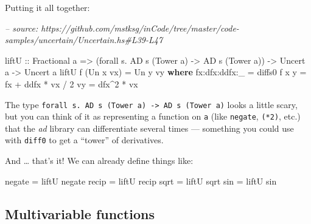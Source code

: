 \documentclass[]{article}
\newenvironment{Shaded}{}{}
\newcommand{\CommentTok}[1]{\textcolor[rgb]{0.38,0.63,0.69}{\textit{#1}}}
\newcommand{\DataTypeTok}[1]{\textcolor[rgb]{0.56,0.13,0.00}{#1}}
\newcommand{\DecValTok}[1]{\textcolor[rgb]{0.25,0.63,0.44}{#1}}
\newcommand{\FunctionTok}[1]{\textcolor[rgb]{0.02,0.16,0.49}{#1}}
\newcommand{\KeywordTok}[1]{\textcolor[rgb]{0.00,0.44,0.13}{\textbf{#1}}}
\newcommand{\NormalTok}[1]{#1}
\newcommand{\OtherTok}[1]{\textcolor[rgb]{0.00,0.44,0.13}{#1}}
\begin{document}
Putting it all together:

\begin{Shaded}
\begin{Highlighting}[]
\CommentTok{-- source: https://github.com/mstksg/inCode/tree/master/code-samples/uncertain/Uncertain.hs#L39-L47}

\OtherTok{liftU ::} \DataTypeTok{Fractional}\NormalTok{ a}
      \OtherTok{=>}\NormalTok{ (forall s}\FunctionTok{.} \DataTypeTok{AD}\NormalTok{ s (}\DataTypeTok{Tower}\NormalTok{ a) }\OtherTok{->} \DataTypeTok{AD}\NormalTok{ s (}\DataTypeTok{Tower}\NormalTok{ a))}
      \OtherTok{->} \DataTypeTok{Uncert}\NormalTok{ a}
      \OtherTok{->} \DataTypeTok{Uncert}\NormalTok{ a}
\NormalTok{liftU f (}\DataTypeTok{Un}\NormalTok{ x vx) }\FunctionTok{=} \DataTypeTok{Un}\NormalTok{ y vy}
  \KeywordTok{where}
\NormalTok{    fx}\FunctionTok{:}\NormalTok{dfx}\FunctionTok{:}\NormalTok{ddfx}\FunctionTok{:}\NormalTok{_ }\FunctionTok{=}\NormalTok{ diffs0 f x}
\NormalTok{    y             }\FunctionTok{=}\NormalTok{ fx }\FunctionTok{+}\NormalTok{ ddfx }\FunctionTok{*}\NormalTok{ vx }\FunctionTok{/} \DecValTok{2}
\NormalTok{    vy            }\FunctionTok{=}\NormalTok{ dfx}\FunctionTok{^}\DecValTok{2} \FunctionTok{*}\NormalTok{ vx}
\end{Highlighting}
\end{Shaded}

The type
\texttt{forall\ s.\ AD\ s\ (Tower\ a)\ -\textgreater{}\ AD\ s\ (Tower\ a)} looks
a little scary, but you can think of it as representing a function on \texttt{a}
(like \texttt{negate}, \texttt{(*2)}, etc.) that the \emph{ad} library can
differentiate several times --- something you could use with \texttt{diff0} to
get a ``tower'' of derivatives.

And \ldots{} that's it! We can already define things like:

\begin{Shaded}
\begin{Highlighting}[]
\NormalTok{negate }\FunctionTok{=}\NormalTok{ liftU negate}
\NormalTok{recip  }\FunctionTok{=}\NormalTok{ liftU recip}
\NormalTok{sqrt   }\FunctionTok{=}\NormalTok{ liftU sqrt}
\NormalTok{sin    }\FunctionTok{=}\NormalTok{ liftU sin}
\end{Highlighting}
\end{Shaded}

\hypertarget{multivariable-functions}{%
\subsection{Multivariable functions}\label{multivariable-functions}}
\end{document}
